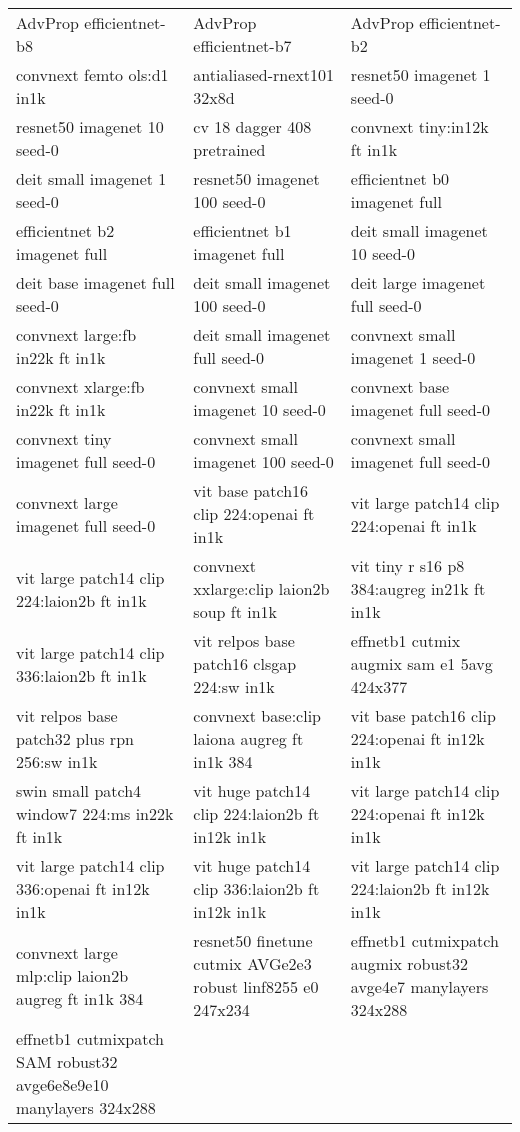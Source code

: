 \begin{small}
\begin{tabular}{|p{4.9cm}|p{4.9cm}|p{4.9cm}|}
AdvProp efficientnet-b8 & AdvProp efficientnet-b7 & AdvProp efficientnet-b2 \\
convnext femto ols:d1 in1k & antialiased-rnext101 32x8d & resnet50 imagenet 1 seed-0 \\
resnet50 imagenet 10 seed-0 & cv 18 dagger 408 pretrained & convnext tiny:in12k ft in1k \\
deit small imagenet 1 seed-0 & resnet50 imagenet 100 seed-0 & efficientnet b0 imagenet full \\
efficientnet b2 imagenet full & efficientnet b1 imagenet full & deit small imagenet 10 seed-0 \\
deit base imagenet full seed-0 & deit small imagenet 100 seed-0 & deit large imagenet full seed-0 \\
convnext large:fb in22k ft in1k & deit small imagenet full seed-0 & convnext small imagenet 1 seed-0 \\
convnext xlarge:fb in22k ft in1k & convnext small imagenet 10 seed-0 & convnext base imagenet full seed-0 \\
convnext tiny imagenet full seed-0 & convnext small imagenet 100 seed-0 & convnext small imagenet full seed-0 \\
convnext large imagenet full seed-0 & vit base patch16 clip 224:openai ft in1k & vit large patch14 clip 224:openai ft in1k \\
vit large patch14 clip 224:laion2b ft in1k & convnext xxlarge:clip laion2b soup ft in1k & vit tiny r s16 p8 384:augreg in21k ft in1k \\
vit large patch14 clip 336:laion2b ft in1k & vit relpos base patch16 clsgap 224:sw in1k & effnetb1 cutmix augmix sam e1 5avg 424x377 \\
vit relpos base patch32 plus rpn 256:sw in1k & convnext base:clip laiona augreg ft in1k 384 & vit base patch16 clip 224:openai ft in12k in1k \\
swin small patch4 window7 224:ms in22k ft in1k & vit huge patch14 clip 224:laion2b ft in12k in1k & vit large patch14 clip 224:openai ft in12k in1k \\
vit large patch14 clip 336:openai ft in12k in1k & vit huge patch14 clip 336:laion2b ft in12k in1k & vit large patch14 clip 224:laion2b ft in12k in1k \\
convnext large mlp:clip laion2b augreg ft in1k 384 & resnet50 finetune cutmix AVGe2e3 robust linf8255 e0 247x234 & effnetb1 cutmixpatch augmix robust32 avge4e7 manylayers 324x288 \\
effnetb1 cutmixpatch SAM robust32 avge6e8e9e10 manylayers 324x288 & & \\
\bottomrule
\end{tabular}
\end{small}


